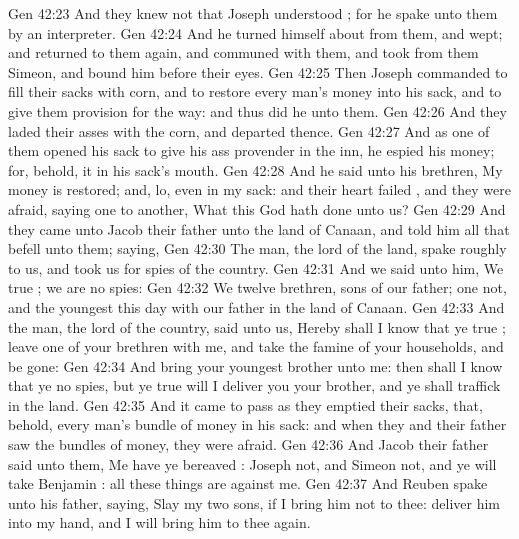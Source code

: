 \vs Gen 42:23 And they knew not that Joseph understood ; for he spake unto them by an interpreter.
\vs Gen 42:24 And he turned himself about from them, and wept; and returned to them again, and communed with them, and took from them Simeon, and bound him before their eyes.
\vs Gen 42:25 Then Joseph commanded to fill their sacks with corn, and to restore every man's money into his sack, and to give them provision for the way: and thus did he unto them.
\vs Gen 42:26 And they laded their asses with the corn, and departed thence.
\vs Gen 42:27 And as one of them opened his sack to give his ass provender in the inn, he espied his money; for, behold, it  in his sack's mouth.
\vs Gen 42:28 And he said unto his brethren, My money is restored; and, lo,  even in my sack: and their heart failed , and they were afraid, saying one to another, What  this  God hath done unto us?
\vs Gen 42:29 And they came unto Jacob their father unto the land of Canaan, and told him all that befell unto them; saying,
\vs Gen 42:30 The man,  the lord of the land, spake roughly to us, and took us for spies of the country.
\vs Gen 42:31 And we said unto him, We  true ; we are no spies:
\vs Gen 42:32 We  twelve brethren, sons of our father; one  not, and the youngest  this day with our father in the land of Canaan.
\vs Gen 42:33 And the man, the lord of the country, said unto us, Hereby shall I know that ye  true ; leave one of your brethren  with me, and take  the famine of your households, and be gone:
\vs Gen 42:34 And bring your youngest brother unto me: then shall I know that ye  no spies, but  ye  true  will I deliver you your brother, and ye shall traffick in the land.
\vs Gen 42:35 And it came to pass as they emptied their sacks, that, behold, every man's bundle of money  in his sack: and when  they and their father saw the bundles of money, they were afraid.
\vs Gen 42:36 And Jacob their father said unto them, Me have ye bereaved : Joseph  not, and Simeon  not, and ye will take Benjamin : all these things are against me.
\vs Gen 42:37 And Reuben spake unto his father, saying, Slay my two sons, if I bring him not to thee: deliver him into my hand, and I will bring him to thee again.
